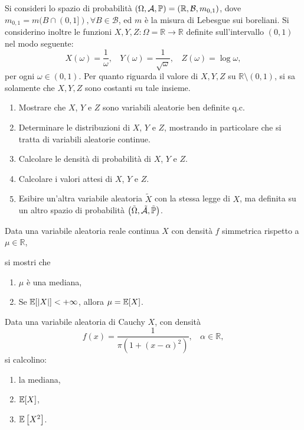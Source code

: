 

\ParteEsercizi
\Esercizio{}

Si consideri lo spazio di probabilità $( \Omega ,\mathcal{A} ,\mathbb{P}) =(\mathbb{R} ,\mathcal{B} ,m_{0,1})$, dove $m_{0,1} =m( B\cap ( 0,1]) ,\forall B\in \mathcal{B}$, ed $m$ è la misura di Lebesgue sui boreliani. Si considerino inoltre le funzioni $X,Y,Z:\Omega =\mathbb{R}\rightarrow \mathbb{R}$ definite sull'intervallo $( 0,1)$ nel modo seguente:
\begin{equation*}
X( \omega ) =\frac{1}{\omega } ,\ \ \ \ Y( \omega ) =\frac{1}{\sqrt{\omega }} ,\ \ \ \ Z( \omega ) =\log \omega ,
\end{equation*}
per ogni $\omega \in ( 0,1)$. Per quanto riguarda il valore di $X,Y,Z$ su $\mathbb{R} \setminus ( 0,1)$, si sa solamente che $X,Y,Z$ sono costanti su tale insieme.
\begin{enumerate}
\item Mostrare che $X$, $Y$ e $Z$ sono variabili aleatorie ben definite q.c.
\item Determinare le distribuzioni di $X$, $Y$ e $Z$, mostrando in particolare che si tratta di variabili aleatorie continue.
\item Calcolare le densità di probabilità di $X$, $Y$ e $Z$.
\item Calcolare i valori attesi di $X$, $Y$ e $Z$.
\item Esibire un'altra variabile aleatoria $\tilde{X}$ con la stessa legge di $X$, ma definita su un altro spazio di probabilità $\left(\tilde{\Omega } ,\tilde{\mathcal{A}} ,\tilde{\mathbb{P}}\right)$.
\end{enumerate}
\Esercizio{}

Data una variabile aleatoria reale continua $X$ con densità $f$ simmetrica rispetto a $\mu \in \mathbb{R}$,

si mostri che
\begin{enumerate}
\item $\mu $ è una mediana,
\item Se $\mathbb{E}[| X| ] < +\infty $, allora $\mu =\mathbb{E}[ X]$.
\end{enumerate}

Data una variabile aleatoria di Cauchy $X$, con densità
\begin{equation*}
f( x) =\frac{1}{\pi \left( 1+( x-\alpha )^{2}\right)} ,\ \ \ \ \alpha \in \mathbb{R} ,
\end{equation*}
si calcolino:
\begin{enumerate}
\item la mediana,
\item $\mathbb{E}[ X]$,
\item $\mathbb{E}\left[ X^{2}\right]$.
\end{enumerate}
\Esercizio{$\star$}

